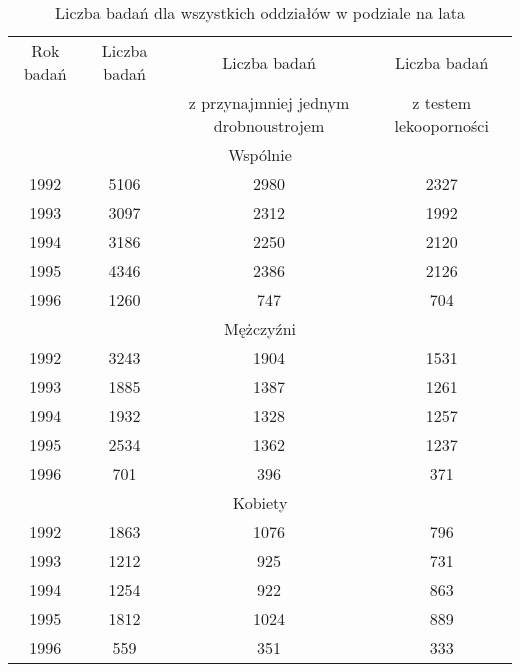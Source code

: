\documentclass[a4paper,11pt]{article}
\begin{document}
\begin{table}[H]
\begin{center}
\caption{Liczba badań dla wszystkich oddziałów w podziale na lata }
\begin{tabular}{c|c|c|c}
\hline
Rok badań & Liczba badań & Liczba badań & Liczba badań\\ 
          &              & z przynajmniej jednym drobnoustrojem &z testem lekooporności \\ \hline
\multicolumn{4}{c}{Wspólnie} \\ \hline
1992 &5106 &2980& 2327 \\ \hline
1993 &3097 &2312& 1992 \\ \hline
1994 &3186 &2250& 2120 \\ \hline
1995 &4346 &2386& 2126 \\ \hline
1996 &1260 &747& 704 \\ \hline


\multicolumn{4}{c}{Mężczyźni} \\ \hline
1992 &3243 &1904& 1531 \\ \hline
1993 &1885 &1387& 1261 \\ \hline
1994 &1932 &1328& 1257 \\ \hline
1995 &2534 &1362& 1237 \\ \hline
1996 &701 &396& 371 \\ \hline


\multicolumn{4}{|c|}{Kobiety} \\ \hline
1992 &1863 &1076& 796 \\ \hline
1993 &1212 &925& 731 \\ \hline
1994 &1254 &922& 863 \\ \hline
1995 &1812 &1024& 889 \\ \hline
1996 &559 &351& 333 \\ \hline

\end{tabular}
\end{center}
\end{table}
\end{document}
